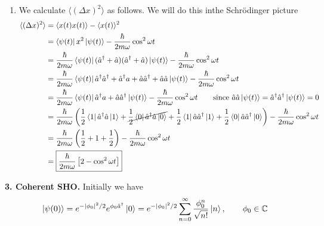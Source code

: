 \documentclass{article}
\theoremstyle{definition}
\newcommand{\f}[2]{\frac{#1}{#2}}
\newcommand{\lp}{\left(}
\newcommand{\rp}{\right)}
\newcommand{\lb}{\left[}
\newcommand{\rb}{\right]}
\begin{document}
\begin{enumerate}[label=(\alph*)]
	\item We calculate $\langle (\Delta x)^2\rangle$ as follows. We will do this inthe Schr\"{o}dinger picture
	\begin{align*}
	\langle (\Delta x)^2 \rangle &= \langle x(t)x(t) \rangle - \langle x(t)\rangle^2\\
	&=  \bra{\psi(t)} x^2 \ket{\psi(t)} - \f{\hbar}{2m\omega}\cos^2\omega t \\
	&= \f{\hbar}{2m\omega} \bra{\psi(t)} (\hat a^\dagger + \hat a)(\hat a^\dagger + \hat a) \ket{\psi(t)} - \f{\hbar}{2m\omega}\cos^2\omega t \\
	&= \f{\hbar}{2m\omega} \bra{\psi(t)} \hat a^\dagger \hat a^\dagger + \hat a^\dagger a + \hat a \hat a^\dagger + \hat a \hat a\ket{\psi(t)} - \f{\hbar}{2m\omega}\cos^2\omega t\\
	&= \f{\hbar}{2m\omega} \bra{\psi(t)}  \hat a^\dagger a + \hat a \hat a^\dagger \ket{\psi(t)} - \f{\hbar}{2m\omega}\cos^2\omega t \quad\quad\text{since } \hat a\hat a \ket{\psi(t)} = \hat a^\dagger \hat a^\dagger \ket{\psi(t)} = 0 \\
	&= \f{\hbar }{2m\omega}\lp \f{1}{2}\bra{1}\hat a^\dagger \hat a\ket{1} + \cancel{\f{1}{2}\bra{0}\hat a^\dagger \hat a\ket{0}} + \f{1}{2}\bra{1}\hat a \hat a^\dagger\ket{1} + \f{1}{2}\bra{0}\hat a \hat a^\dagger\ket{0} \rp  - \f{\hbar}{2m\omega}\cos^2\omega t\\
	&= \f{\hbar }{2m\omega}\lp \f{1}{2} + 1 + \f{1}{2} \rp  - \f{\hbar}{2m\omega}\cos^2\omega t\\
	&= \boxed{	\f{\hbar}{2m\omega}\lb 2 - \cos^2\omega t \rb}
	\end{align*}
\end{enumerate}


\noindent \textbf{3. Coherent SHO.} Initially we have
\begin{align*}
\ket{\psi(0)} = e^{-\abs{\phi_0}^2/2}e^{\phi_0 \hat a^\dagger}\ket{0} = e^{-\abs{\phi_0}^2/2}\sum_{n=0}^\infty \f{\phi_0^n}{\sqrt{n!}}\ket{n}
,\quad\quad \phi_0 \in \mathbb{C} 
\end{align*}
	
\end{document}
